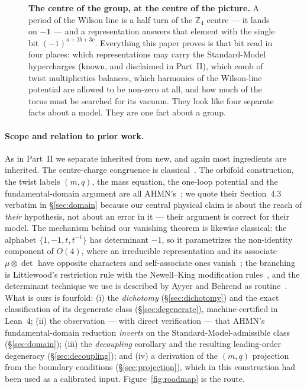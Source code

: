 \documentclass[11pt,a4paper]{article}
\newcommand{\ZZ}{\mathbb{Z}}
\begin{document}
\begin{figure}[!t]
\caption{\textbf{The centre of the group, at the centre of the picture.} A period of the
Wilson line is a half turn of the $\ZZ_4$ centre --- it lands on $-\mathbf{1}$ --- and a
representation answers that element with the single bit $(-1)^{a+2b+3c}$. Everything this
paper proves is that bit read in four places: which representations may carry the
Standard-Model hypercharges (known, and disclaimed in Part~II), which comb of twist
multiplicities balances, which harmonics of the Wilson-line potential are allowed to be
non-zero at all, and how much of the torus must be searched for its vacuum. They look like
four separate facts about a model. They are one fact about a group.}
\label{fig:chain}
\end{figure}

\paragraph{Scope and relation to prior work.} As in Part~II we separate inherited from new,
and again most ingredients are inherited. The centre-charge congruence is
classical~\cite{Hucks,Saller,Tong,Alonso,Slansky}. The orbifold construction, the twist
labels $(m,q)$, the mass equation, the one-loop potential and the fundamental-domain
argument are all AHMN's~\cite{AHMN}; we quote their Section~4.3 verbatim in
\S\ref{sec:domain} because our central physical claim is about the reach of \emph{their}
hypothesis, not about an error in it --- their argument is correct for their model. The
mechanism behind our vanishing theorem is likewise classical: the alphabet
$\{1,-1,t,t^{-1}\}$ has determinant $-1$, so it parametrizes the non-identity component of
$O(4)$, where an irreducible representation and its associate $\mu\otimes\det$ have opposite
characters and self-associate ones vanish~\cite{Brauer}; the branching is Littlewood's
restriction rule with the Newell--King modification rules~\cite{King71,Newell,Brauer}, and
the determinant technique we use is described by Ayyer and Behrend as
routine~\cite{AyyerBehrend}. What is ours is fourfold: (i) the \emph{dichotomy}
(\S\ref{sec:dichotomy}) and the exact classification of its degenerate class
(\S\ref{sec:degenerate}), machine-certified in Lean~4; (ii) the observation --- with direct
verification --- that AHMN's fundamental-domain reduction \emph{inverts} on the
Standard-Model-admissible class (\S\ref{sec:domain}); (iii) the \emph{decoupling}
corollary and the resulting leading-order degeneracy (\S\ref{sec:decoupling}); and (iv) a
derivation of the $(m,q)$ projection from the boundary conditions (\S\ref{sec:projection}),
which in this construction had been used as a calibrated input. Figure~\ref{fig:roadmap} is
the route.
\end{document}
